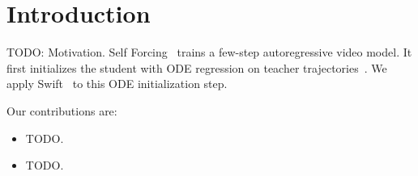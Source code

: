 \section{Introduction}
\label{sec:intro}

TODO: Motivation. Self Forcing~\citep{huang2025selfforcing} trains a few-step
autoregressive video model. It first initializes the student with ODE
regression on teacher trajectories~\citep{yin2025causvid}. We apply
Swift~\citep{swift} to this ODE initialization step.

Our contributions are:
\begin{itemize}
  \item TODO.
  \item TODO.
\end{itemize}
